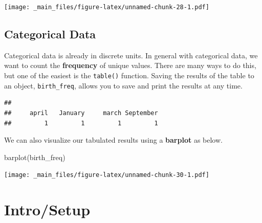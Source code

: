 \documentclass[
]{book}
\newenvironment{Shaded}{\begin{snugshade}}{\end{snugshade}}
\newcommand{\AttributeTok}[1]{\textcolor[rgb]{0.77,0.63,0.00}{#1}}
\newcommand{\FunctionTok}[1]{\textcolor[rgb]{0.00,0.00,0.00}{#1}}
\newcommand{\NormalTok}[1]{#1}
\newcommand{\OtherTok}[1]{\textcolor[rgb]{0.56,0.35,0.01}{#1}}
\newcommand{\SpecialCharTok}[1]{\textcolor[rgb]{0.00,0.00,0.00}{#1}}
\newcommand{\StringTok}[1]{\textcolor[rgb]{0.31,0.60,0.02}{#1}}
\begin{document}
\begin{Shaded}
\end{Shaded}

\texttt{[image: \_main\_files/figure-latex/unnamed-chunk-28-1.pdf]}

\hypertarget{categorical-data-1}{%
\section*{Categorical Data}\label{categorical-data-1}}

Categorical data is already in discrete units. In general with categorical data, we want to count the \textbf{frequency} of unique values. There are many ways to do this, but one of the easiest is the \texttt{table()} function. Saving the results of the table to an object, \texttt{birth\_freq}, allows you to save and print the results at any time.

\begin{Shaded}
\end{Shaded}

\begin{verbatim}
## 
##     april   January     march September 
##         1         1         1         1
\end{verbatim}

We can also visualize our tabulated results using a \textbf{barplot} as below.

\begin{Shaded}
\begin{Highlighting}[]
\FunctionTok{barplot}\NormalTok{(birth\_freq)}
\end{Highlighting}
\end{Shaded}

\texttt{[image: \_main\_files/figure-latex/unnamed-chunk-30-1.pdf]}

\hypertarget{introsetup}{%
\chapter{Intro/Setup}\label{introsetup}}
\end{document}
